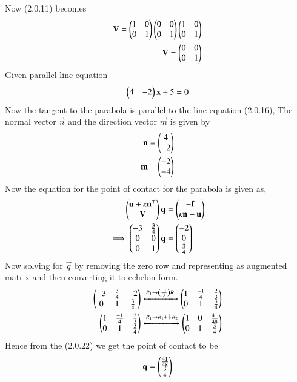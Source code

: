 \documentclass[journal,12pt,twocolumn]{IEEEtran}
\begin{document}
Now (2.0.11) becomes
\begin{align}
    \mathbf{V}=\begin{pmatrix}1&0 \\ 0&1\end{pmatrix}\begin{pmatrix}0&0 \\ 0&1\end{pmatrix}\begin{pmatrix}1&0 \\ 0&1\end{pmatrix}
    \\
    \mathbf{V}=\begin{pmatrix}0&0 \\ 0&1\end{pmatrix}
\end{align}
Given parallel line equation 
\begin{align}
 \begin{pmatrix}4&-2\end{pmatrix}\mathbf{x} + 5 = 0
\end{align}
Now the tangent to the parabola is parallel to the line equation (2.0.16),
The normal vector $\vec{n}$ and the direction vector $\vec{m}$ is given by 
\begin{align}
    \mathbf{n}=\begin{pmatrix}4 \\ -2\end{pmatrix}
    \\
    \mathbf{m}=\begin{pmatrix}-2 \\ -4\end{pmatrix}
\end{align}
Now the equation for the point of contact for the parabola is given as,
\begin{align}
    \begin{pmatrix}\mathbf{u}+\kappa \mathbf{n}^{\top} \\ \mathbf{V} \end{pmatrix}\mathbf{q} &= \begin{pmatrix}\mathbf{-f}\\\kappa \mathbf{n} -\mathbf{u}\end{pmatrix}
    \\
   \implies\begin{pmatrix}-3&\frac{3}{4} \\ 0&0 \\ 0&1\end{pmatrix} \mathbf{q}&= \begin{pmatrix}-2 \\ 0 \\ \frac{3}{4}\end{pmatrix}
\end{align}
Now solving for $\vec{q}$ by removing the zero row and representing as augmented matrix and then converting it to echelon form.
\begin{align}
    \begin{pmatrix}-3&\frac{3}{4}&-2 \\ 0&1&\frac{3}{4}\end{pmatrix}\xleftrightarrow{R_1\rightarrow \ensuremath{\left(\frac{-1}{3}\right)}R_1} \begin{pmatrix}1&\frac{-1}{4}&\frac{2}{3} \\ 0&1&\frac{3}{4}\end{pmatrix}
    \\
    \begin{pmatrix}1&\frac{-1}{4}&\frac{2}{3} \\ 0&1&\frac{3}{4}\end{pmatrix}\xleftrightarrow{R_1\rightarrow R_1+\frac{1}{4}R_2}\begin{pmatrix}1&0&\frac{41}{48} \\ 0&1&\frac{3}{4}\end{pmatrix}
\end{align}
Hence from the (2.0.22) we get the point of contact to be 
\begin{align}
    \mathbf{q}=\begin{pmatrix}\frac{41}{48} \\ \frac{3}{4}\end{pmatrix}
\end{align}
\end{document}
